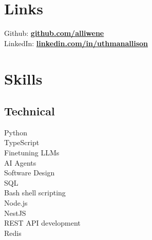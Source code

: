 \documentclass[letterpaper]{deedy-resume} %
\begin{document}
\begin{minipage}[t]{0.33\textwidth} %



\section{Links} 
Github: \href{https://github.com/alliwene}{\bf github.com/alliwene} \\
LinkedIn: \href{https://www.linkedin.com/in/uthmanallison}{\bf linkedin.com/in/uthmanallison} \\

\sectionspace %




\section{Skills}

\subsection{Technical}
Python \\
TypeScript \\
Finetuning LLMs \\
AI Agents \\
Software Design \\
SQL \\
Bash shell scripting \\
Node.js \\
NestJS \\
REST API development \\
Redis

\sectionspace %



\end{minipage}
\end{document}
